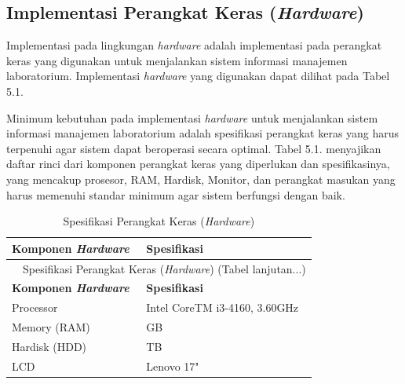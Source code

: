 \subsection{Implementasi Perangkat Keras (\textit{Hardware})}
Implementasi pada lingkungan \textit{hardware} adalah implementasi pada perangkat keras yang digunakan untuk menjalankan sistem informasi manajemen laboratorium. Implementasi \textit{hardware} yang digunakan dapat dilihat pada Tabel 5.1.

Minimum kebutuhan pada implementasi \textit{hardware} untuk menjalankan sistem informasi manajemen laboratorium adalah spesifikasi perangkat keras yang harus terpenuhi agar sistem dapat beroperasi secara optimal. Tabel 5.1. menyajikan daftar rinci dari komponen perangkat keras yang diperlukan dan spesifikasinya, yang mencakup prosesor, RAM, Hardisk, Monitor, dan perangkat masukan yang harus memenuhi standar minimum agar sistem berfungsi dengan baik.

\begin{longtable}{l l}
	\caption{Spesifikasi Perangkat Keras (\textit{Hardware})}                                                                                               \\
	\hline
	\textbf{\fontsize{11pt}{13pt}\selectfont Komponen \textit{Hardware}} & \textbf{\fontsize{11pt}{13pt}\selectfont Spesifikasi}                            \\
	\hline
	\endfirsthead

	\multicolumn{2}{c}{\tablename\ \thetable\ {Spesifikasi Perangkat Keras (\textit{Hardware})} \space (Tabel lanjutan...)}                                 \\
	\hline
	\textbf{\fontsize{11pt}{13pt}\selectfont Komponen \textit{Hardware}} & \textbf{\fontsize{11pt}{13pt}\selectfont Spesifikasi}                            \\
	\hline
	\endhead

	\fontsize{11pt}{13pt}\selectfont Processor                           & \fontsize{11pt}{13pt}\selectfont Intel \textregistered{} CoreTM i3-4160, 3.60GHz \\
	\fontsize{11pt}{13pt}\selectfont Memory (RAM)                        & \fontsize{11pt}{13pt}\selectfont 2 GB                                            \\
	\fontsize{11pt}{13pt}\selectfont Hardisk (HDD)                       & \fontsize{11pt}{13pt}\selectfont 1 TB                                            \\
	\fontsize{11pt}{13pt}\selectfont LCD                                 & \fontsize{11pt}{13pt}\selectfont Lenovo 17"                                      \\
	\hline
\end{longtable}

